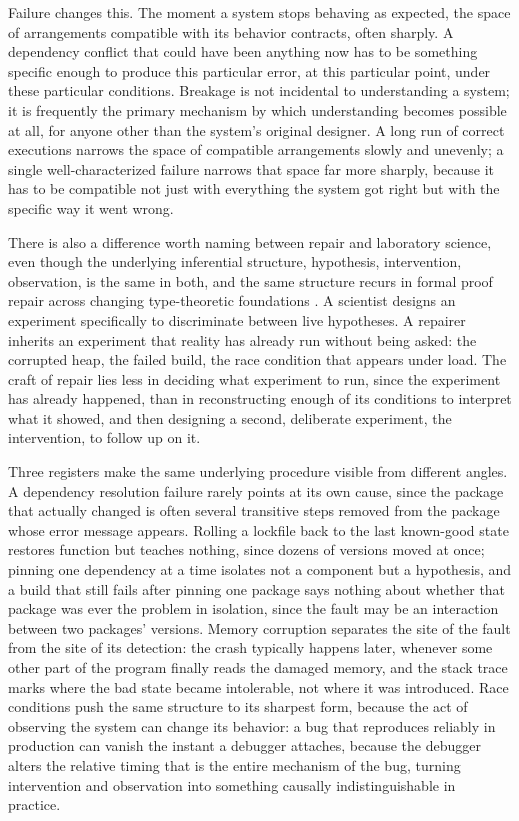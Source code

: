 Failure changes this. The moment a system stops behaving as expected, the space of arrangements compatible with its behavior contracts, often sharply. A dependency conflict that could have been anything now has to be something specific enough to produce this particular error, at this particular point, under these particular conditions. Breakage is not incidental to understanding a system; it is frequently the primary mechanism by which understanding becomes possible at all, for anyone other than the system's original designer. A long run of correct executions narrows the space of compatible arrangements slowly and unevenly; a single well-characterized failure narrows that space far more sharply, because it has to be compatible not just with everything the system got right but with the specific way it went wrong.

There is also a difference worth naming between repair and laboratory science, even though the underlying inferential structure, hypothesis, intervention, observation, is the same in both, and the same structure recurs in formal proof repair across changing type-theoretic foundations \cite{ringer2020}. A scientist designs an experiment specifically to discriminate between live hypotheses. A repairer inherits an experiment that reality has already run without being asked: the corrupted heap, the failed build, the race condition that appears under load. The craft of repair lies less in deciding what experiment to run, since the experiment has already happened, than in reconstructing enough of its conditions to interpret what it showed, and then designing a second, deliberate experiment, the intervention, to follow up on it.

Three registers make the same underlying procedure visible from different angles. A dependency resolution failure rarely points at its own cause, since the package that actually changed is often several transitive steps removed from the package whose error message appears. Rolling a lockfile back to the last known-good state restores function but teaches nothing, since dozens of versions moved at once; pinning one dependency at a time isolates not a component but a hypothesis, and a build that still fails after pinning one package says nothing about whether that package was ever the problem in isolation, since the fault may be an interaction between two packages' versions. Memory corruption separates the site of the fault from the site of its detection: the crash typically happens later, whenever some other part of the program finally reads the damaged memory, and the stack trace marks where the bad state became intolerable, not where it was introduced. Race conditions push the same structure to its sharpest form, because the act of observing the system can change its behavior: a bug that reproduces reliably in production can vanish the instant a debugger attaches, because the debugger alters the relative timing that is the entire mechanism of the bug, turning intervention and observation into something causally indistinguishable in practice.

